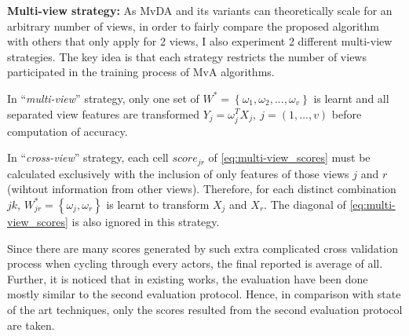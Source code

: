     \textbf{Multi-view strategy:} As MvDA and its variants can theoretically scale for an arbitrary number of views, in order to fairly compare the proposed algorithm with others that only apply for 2 views, I also experiment 2 different multi-view strategies. The key idea is that each strategy restricts the number of views participated in the training process of MvA algorithms.

    In ``\emph{multi-view}'' strategy, only one set of $W^*=\left\{{\omega}_1, {\omega}_2, ..., {\omega}_v\right\}$ is learnt and all separated view features are transformed $Y_j=\omega_j^TX_j,\ j=(1,...,v)$ before computation of accuracy.

    In ``\emph{cross-view}'' strategy, each cell ${score}_{jr}$ of \eqref{eq:multi-view_scores} must be calculated exclusively with the inclusion of only features of those views $j$ and $r$ (wihtout information from other views).
    Therefore, for each distinct combination $jk$, $W_{jr}^*=\left\{{\omega}_j, {\omega}_r\right\}$ is learnt to transform $X_j$ and $X_r$. The diagonal of \eqref{eq:multi-view_scores} is also ignored in this strategy.

    Since there are many scores generated by such extra complicated cross validation process when cycling through every actors, the final reported is average of all.
    Further, it is noticed that in existing works, the evaluation have been done mostly similar to the second evaluation protocol. Hence, in comparison with state of the art techniques, only the scores resulted from the second evaluation protocol are taken.

